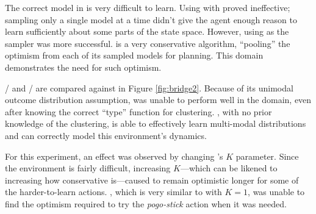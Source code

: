 The correct model in  is very difficult to learn. Using  with  proved ineffective; sampling only a single model at a time didn't give the agent enough reason to learn sufficiently about some parts of the state space. However, using  as the sampler was more successful.  is a very conservative algorithm, ``pooling'' the optimism from each of its sampled models for planning. This domain demonstrates the need for such optimism.

/ and / are compared against  in Figure \ref{fig:bridge2}. Because of its unimodal outcome distribution assumption,  was unable to perform well in the  domain, even after knowing the correct ``type'' function for clustering. , with no prior knowledge of the clustering, is able to effectively learn multi-modal distributions and can correctly model this environment's dynamics. 

For this experiment, an effect was observed by changing 's $K$ parameter. Since the environment is fairly difficult, increasing $K$---which can be likened to increasing how conservative  is---caused  to remain optimistic longer for some of the harder-to-learn actions. , which is very similar to  with $K=1$, was unable to find the optimism required to try the \emph{pogo-stick} action when it was needed.

